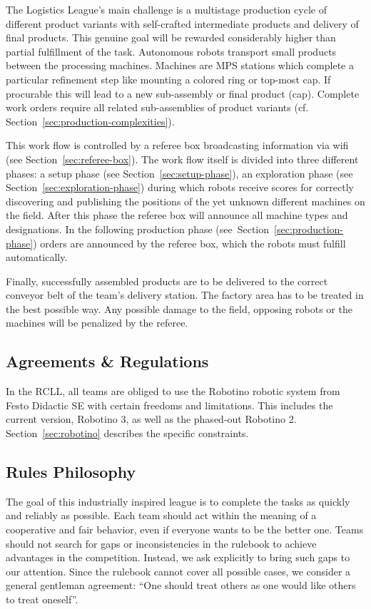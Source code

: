 \documentclass[12pt,twoside]{article}
\newcommand{\refsec}[1]{Section~\ref{#1}}
\begin{document}
The Logistics League's main challenge is a multistage production cycle
of different product variants with self-crafted intermediate products
and delivery of final products. This genuine goal will be rewarded
considerably higher than partial fulfillment of the task. Autonomous
robots transport small products between the processing
machines. Machines are MPS stations which complete a particular
refinement step like mounting a colored ring or top-most cap. If
procurable this will lead to a new sub-assembly or final product
(cap). Complete work orders require all related sub-assemblies of
product variants (cf. \refsec{sec:production-complexities}).

This work flow is controlled by a referee box broadcasting information
via wifi (see \refsec{sec:referee-box}). The work flow itself is
divided into three different phases: a setup
phase (see \refsec{sec:setup-phase}), an exploration phase (see
\refsec{sec:exploration-phase}) during which robots receive scores for
correctly discovering and publishing the positions of the yet
unknown different machines on the field. After this phase the referee
box will announce all machine types and designations. In the following
production phase (see~\refsec{sec:production-phase}) orders are
announced by the referee box, which the robots must fulfill
automatically.

Finally, 
successfully assembled products are to be delivered to the correct
conveyor belt of the team's delivery station. The factory
area has to be treated in the best possible way. Any possible damage
to the field, opposing robots or the machines will be penalized by the
referee.

\subsection{Agreements \& Regulations}
\label{sec:agreements}
In the RCLL, all teams are obliged to use the Robotino robotic system
from Festo Didactic SE with certain freedoms and limitations. This
includes the current version, Robotino 3, as well as the phased-out
Robotino 2. \refsec{sec:robotino} describes the specific constraints.



\subsection{Rules Philosophy}
\label{sec:rules-philosphy}
The goal of this industrially inspired league is to complete the tasks
as quickly and reliably as possible. Each team should act within the
meaning of a cooperative and fair behavior, even if everyone wants to
be the better one. Teams should not search for gaps or inconsistencies
in the rulebook to achieve advantages in the competition. Instead, we
ask explicitly to bring such gaps to our attention. Since the rulebook
cannot cover all possible cases, we consider a general gentleman
agreement: ``One should treat others as one would like others to treat
oneself''.
\end{document}
